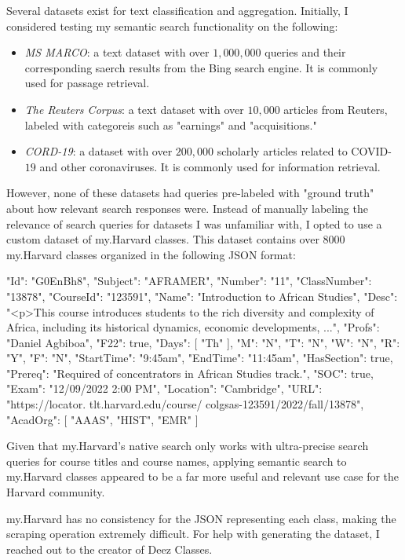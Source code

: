 \documentclass[
	a4paper, %
	10pt, %
	unnumberedsections, %
	twoside, %
]{LTJournalArticle}
\begin{document}
Several datasets exist for text classification and  aggregation. Initially, I considered testing my semantic search functionality on the following: 
\begin{itemize}
	\item \textit{MS MARCO}: a text dataset with over $1,000,000$ queries and their corresponding saerch results from the Bing search engine. It is commonly used for passage retrieval. 
	\item \textit{The Reuters Corpus}: a text dataset with over $10,000$ articles from Reuters, labeled with categoreis such as "earnings" and "acquisitions."
	\item \textit{CORD-19}: a dataset with over $200,000$ scholarly articles related to COVID-$19$ and other coronaviruses. It is commonly used for information retrieval.
\end{itemize}

However, none of these datasets had queries pre-labeled with "ground truth" about how relevant search responses were. Instead of manually labeling the relevance of search queries for datasets I was unfamiliar with, I opted to use a custom dataset of my.Harvard classes. This dataset contains over $8000$ my.Harvard classes organized in the following JSON format: 

\begin{python}
	{
		"Id": "G0EnBh8",
		"Subject": "AFRAMER",
		"Number": "11",
		"ClassNumber": "13878",
		"CourseId": "123591",
		"Name": "Introduction to African 
		Studies",
		"Desc": "<p>This course introduces 
		students to the rich diversity and 
		complexity of Africa, including 
		its historical dynamics, 
		economic developments, ...",
		"Profs": "Daniel Agbiboa",
		"F22": true,
		"Days": [
		"Th"
		],
		"M": "N",
		"T": "N",
		"W": "N",
		"R": "Y",
		"F": "N",
		"StartTime": "9:45am",
		"EndTime": "11:45am",
		"HasSection": true,
		"Prereq": "Required of 
		concentrators in African 
		Studies track.",
		"SOC": true,
		"Exam": "12/09/2022 2:00 PM",
		"Location": "Cambridge",
		"URL": "https://locator.
		tlt.harvard.edu/course/
		colgsas-123591/2022/fall/13878",
		"AcadOrg": [
		"AAAS",
		"HIST",
		"EMR"
		]
	}
\end{python}

Given that my.Harvard's native search only works with ultra-precise search queries for course titles and course names, applying semantic search to my.Harvard classes appeared to be a far more useful and relevant use case for the Harvard community.

my.Harvard has no consistency for the JSON representing each class, making the scraping operation extremely difficult. For help with generating the dataset, I reached out to the creator of Deez Classes. 
\end{document}
